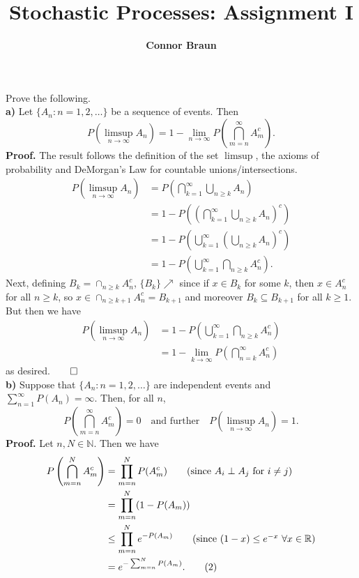 \documentclass[11pt, letterpaper]{article}
\title{\bf Stochastic Processes: Assignment I}
\author{\bf Connor Braun}
\date{}
\newcommand{\mbb}[1]{\mathbb{#1}}
\begin{document}
    \maketitle
     Prove the following.\\[10pt]
    {\bf a)} Let $\{A_n:n=1,2,\dots\}$ be a sequence of events. Then
    \[P\left(\limsup_{n\rightarrow\infty}A_n\right)=1-\lim_{n\rightarrow\infty}P\left(\bigcap_{m=n}^\infty A_m^c\right).\]
    {\bf Proof.} The result follows the definition of the set $\limsup$, the axioms of probability and DeMorgan's Law for countable unions/intersections.
    \begin{align*}
        P\left(\limsup_{n\rightarrow\infty}A_n\right)&=P\left(\bigcap_{k=1}^\infty\bigcup_{n\geq k}A_n\right)\\
        &=1-P\left(\left(\bigcap_{k=1}^\infty\bigcup_{n\geq k}A_n\right)^c\right)\tag{axiom of probability}\\
        &=1-P\left(\bigcup_{k=1}^\infty\left(\bigcup_{n\geq k}A_n\right)^c\right)\tag{DeMorgan's law for countable intersection}\\
        &=1-P\left(\bigcup_{k=1}^\infty\bigcap_{n\geq k}A_n^c\right).\tag{DeMorgan's law for countable union}
    \end{align*}
    Next, defining $B_k=\cap_{n\geq k}A_n^c$, $\{B_k\}\nearrow$ since if $x\in B_k$ for some $k$, then $x\in A_n^c$ for all $n\geq k$, so $x\in \cap_{n\geq k+1}A_n^c=B_{k+1}$ 
    and moreover $B_k\subseteq B_{k+1}$ for all $k\geq 1$. But then we have
    \begin{align*}
        P\left(\limsup_{n\rightarrow\infty}A_n\right)&=1-P\left(\bigcup_{k=1}^\infty\bigcap_{n\geq k}A_n^c\right)\\
        &=1-\lim_{k\rightarrow\infty}P\left(\bigcap_{n=k}^\infty A_n^c\right)
    \end{align*}
    as desired.\hfill{$\qed$}\\[10pt]
    {\bf b)} Suppose that $\{A_n:n=1,2,\dots\}$ are independent events and $\sum_{n=1}^\infty P(A_n)=\infty$. Then, for all $n$, 
    \[P\left(\bigcap_{m=n}^\infty A_m^c\right)=0\quad\text{and further}\quad P\left(\limsup_{n\rightarrow\infty}A_n\right)=1.\]
    {\bf Proof.} Let $n,N\in\mbb{N}$. Then we have
    \begin{align*}
        P\left(\bigcap_{m=n}^NA_m^c\right)&=\prod_{m=n}^NP(A_m^c)\tag{since $A_i\perp A_j$ for $i\neq j$}\\
        &=\prod_{m=n}^N(1-P(A_m))\\
        &\leq\prod_{m=n}^Ne^{-P(A_m)}\tag{since $(1-x)\leq e^{-x}$ $\forall x\in\mbb{R}$}\\
        &=e^{-\sum_{m=n}^NP(A_m)}.\tag{2}
    \end{align*}
\end{document}
